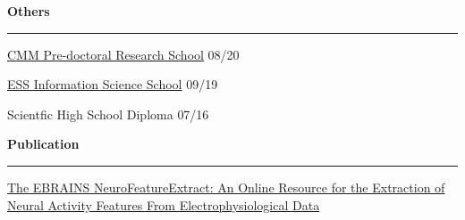 \documentclass[11pt,letterpaper]{article}
\begin{document}
\begin{justify}
      \begin{minipage}[t]{9.1cm}
            \textbf{Others}\strut
            \hrule
            \vspace{0.2cm}
            \begin{itemize}[label={}, leftmargin=0pt]
                  \begin{item}
                        \href{https://cmmrs2020.mpi-sws.org/}{CMM Pre-doctoral Research School}
                        \hfill
                        \small{08/20}
                  \end{item}
                  \begin{item}
                        \href{http://einfose.ffos.hr/summer-school/}{ESS Information Science School}
                        \hfill
                        \small{09/19}
                  \end{item}
                  \begin{item}
                        Scientfic High School Diploma
                        \hfill
                        \small{07/16}
                  \end{item}
            \end{itemize}
      \end{minipage}
      \hfill
      \begin{minipage}[t]{9.1cm}
            \textbf{Publication}\strut
            \hrule
            \vspace{0.2cm}
            \href{https://www.frontiersin.org/articles/10.3389/fninf.2021.713899/full}{The EBRAINS NeuroFeatureExtract: An Online Resource for the Extraction of Neural Activity Features From Electrophysiological Data}
      \end{minipage}


\end{justify}
\end{document}
